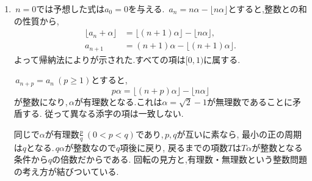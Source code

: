     \noindent {}\par\nobreak
    \begin{enumerate}[label=(\arabic*),parsep=3pt,beginpenalty=10000,format=\bookitemlink{example-gauss-role-9}{solution}{problem}]
      \item \,$n=0$では予想した式は$a_0=0$を与える.
            \,$a_n=n\alpha-\lfloor n\alpha\rfloor$とすると,整数との和の性質から,
            \begin{align*}
              \lfloor a_n+\alpha\rfloor
                &=\lfloor(n+1)\alpha\rfloor-\lfloor n\alpha\rfloor,\\
              a_{n+1}
                &=(n+1)\alpha-\lfloor(n+1)\alpha\rfloor.
            \end{align*}
            よって帰納法によりが示された.すべての項は$[0,1)$に属する.

            \,$a_{n+p}=a_n\ (p\ge1)$とすると,
            \[
              p\alpha=\lfloor(n+p)\alpha\rfloor-\lfloor n\alpha\rfloor
            \]
            が整数になり,\,$\alpha$が有理数となる.これは$\alpha=\sqrt2-1$が無理数であることに矛盾する.
            従って異なる添字の項は一致しない.

            同じで$\alpha$が有理数$\frac pq\ (0<p<q)$であり,\,$p,q$が互いに素なら,
            最小の正の周期は$q$となる.\,$q\alpha$が整数なので$q$項後に戻り,
            戻るまでの項数$T$は$T\alpha$が整数となる条件から$q$の倍数だからである.
            回転の見方と,有理数・無理数という整数問題の考え方が結びついている.
    \end{enumerate}
